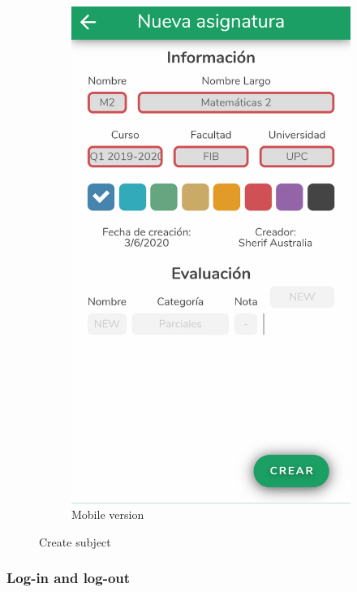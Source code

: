 \begin{figure}[ht!]
\begin{subfigure}[b]{0.243\textwidth-0.1cm}
        \includegraphics[frame,width=\textwidth]{media/screenshots/screenshot-create.png}
        \caption{Mobile version}
    \end{subfigure}
    \caption{Create subject}
    \label{fig:create}
\end{figure}
\vfill

\clearpage\newpage
\subsubsection{Log-in and log-out}

